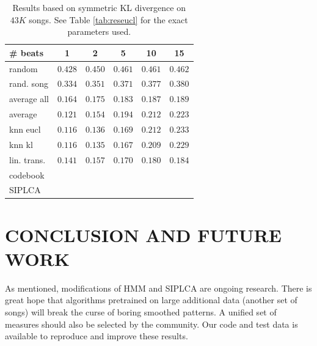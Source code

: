 \documentclass{article}
\begin{document}
\begin{table}[t]
\begin{small}
\begin{center}
\begin{tabular}{l|c|c|c|c|c|}
\# beats & 1 & 2 & 5 & 10 & 15 \\ \hline \hline
random & $0.428$ & $0.450$ & $0.461$ & $0.461$ & $0.462$  \\
rand. song & $0.334$ & $0.351$ & $0.371$ & $0.377$ & $0.380$  \\
average all & $0.164$ & $0.175$ & $0.183$ & $0.187$ & $0.189$ \\ 
average & $0.121$ & $0.154$ & $0.194$ & $0.212$ &  $0.223$ \\ \hline
knn eucl & $\mathbf{0.116}$ & $0.136$ & $0.169$ & $0.212$ & $0.233$ \\
knn kl & $\mathbf{0.116}$ & $\mathbf{0.135}$ & $\mathbf{0.167}$ & $0.209$ & $0.229$ \\
lin. trans. & $0.141$ & $0.157$ & $0.170$ & $\mathbf{0.180}$ & $\mathbf{0.184}$ \\
codebook & & & & &  \\
SIPLCA & & & & &  \\ \hline
\end{tabular}
\caption{Results based on symmetric KL divergence on $43K$ songs.
See Table \ref{tab:reseucl} for the exact parameters used.}
\label{tab:reskl}
\end{center}
\end{small}
\end{table}
\fi

\section{CONCLUSION AND FUTURE WORK}
\label{sec:conclusion}
As mentioned, modifications of HMM and SIPLCA are ongoing
research. There is great hope that algorithms pretrained
on large additional data (another set of songs) will break
the curse of boring smoothed patterns.
A unified set of measures should also be selected
by the community. Our code and test data is available to 
reproduce and improve these results.






\end{document}

